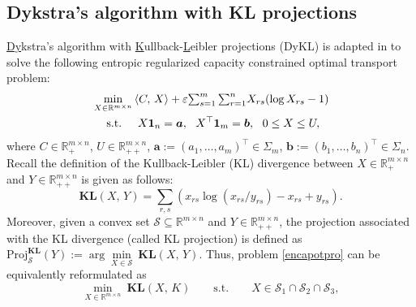 \documentclass[10pt]{article}
\begin{document}
\begin{appendices}
\section{Dykstra's algorithm with KL projections}\label{apdDyKL}


\underline{Dy}kstra's algorithm with \underline{K}ullback-\underline{L}eibler projections (DyKL) \cite{bl2000dykstras} is adapted in \cite{bccnp2015iterative} to solve the following entropic regularized capacity constrained optimal transport problem:
\begin{equation}\label{encapotpro}
\begin{aligned}
&\min\limits_{X\in\mathbb{R}^{m \times n }}\,\langle C, \,X\rangle + \varepsilon{\textstyle\sum^{m}_{s=1}\sum^{n}_{r=1}}X_{rs}(\log X_{rs}-1) \\
&\hspace{0.45cm}\mathrm{s.t.} \hspace{0.5cm} X\bm{1}_{n} = \bm{a}, ~~X^{\top}\bm{1}_{m} = \bm{b},
~~0 \leq X \leq U, \\
\end{aligned}
\end{equation}
where $C\in\mathbb{R}^{m \times n}_+$, $U\in\mathbb{R}^{m \times n}_{++}$, $\bm{a}:=(a_1, \dots, a_{m})^{\top}\in\Sigma_{m}$, $\bm{b}:=(b_1, \dots, b_{n})^{\top}\in\Sigma_{n}$. Recall the definition of the Kullback-Leibler (KL) divergence between $X\in\mathbb{R}^{m\times n}_+$ and $Y\in\mathbb{R}^{m\times n}_{++}$ is given as follows:
\begin{equation*}
\mathbf{KL}(X, \,Y)={\textstyle\sum_{r,s}}\left( x_{rs}\log\left(x_{rs}/y_{rs}\right) - x_{rs} + y_{rs}\right).
\end{equation*}
Moreover, given a convex set $\mathcal{S}\subseteq\mathbb{R}^{m \times n}$ and $Y\in\mathbb{R}^{m\times n}_{++}$, the projection associated with the KL divergence
(called KL projection) is defined as $\mathrm{Proj}^{\mathbf{KL}}_{\mathcal{S}}(Y) := \arg\min\limits_{X\in\mathcal{S}}~\mathbf{KL}(X, \,Y)$.
Thus, problem \eqref{encapotpro} can be equivalently reformulated as
\begin{equation*}%
\min_{X\in\mathbb{R}^{m \times n}}~\mathbf{KL}(X,\,K) \qquad \mathrm{s.t.} \qquad X \in \mathcal{S}_1 \cap \mathcal{S}_2 \cap \mathcal{S}_3,

\end{equation*}
\end{appendices}
\end{document}
